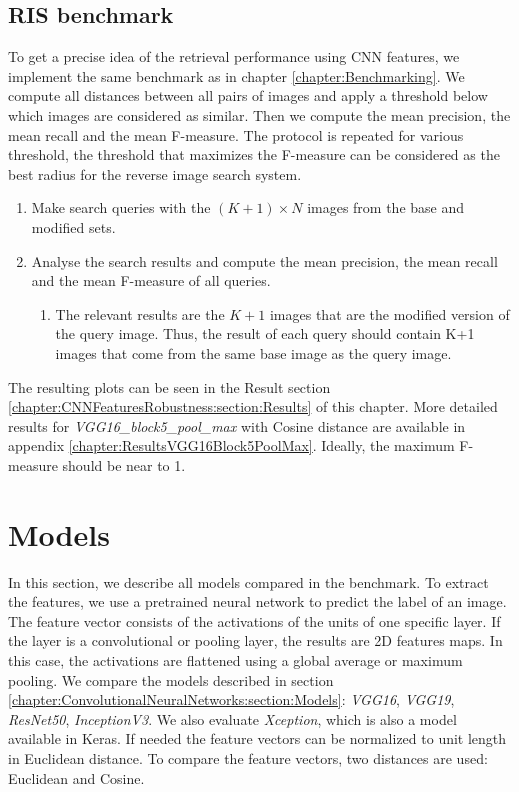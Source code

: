 \subsection{RIS benchmark}
To get a precise idea of the retrieval performance using CNN features, we implement the same benchmark as in chapter \ref{chapter:Benchmarking}. We compute all distances between all pairs of images and apply a threshold below which images are considered as similar. Then we compute the mean precision, the mean recall and the mean F-measure. The protocol is repeated for various threshold, the threshold that maximizes the F-measure can be considered as the best radius for the reverse image search system.

\begin{enumerate}
	\item Make search queries with the $(K+1) \times N$ images from the base and modified sets.
	\item Analyse the search results and compute the mean precision, the mean recall and the mean F-measure of all queries.
	\begin{enumerate}
		\item The relevant results are the $K+1$ images that are the modified version of the query image. Thus, the result of each query should contain K+1 images that come from the same base image as the query image.
	\end{enumerate}
\end{enumerate}

The resulting plots can be seen in the Result section \ref{chapter:CNNFeaturesRobustness:section:Results} of this chapter. More detailed results for \textit{VGG16\_block5\_pool\_max} with Cosine distance are available in appendix \ref{chapter:ResultsVGG16Block5PoolMax}. Ideally, the maximum F-measure should be near to 1.

\section{Models}
\label{chapter:CNNFeaturesRobustness:section:Models}
In this section, we describe all models compared in the benchmark. To extract the features, we use a pretrained neural network to predict the label of an image. The feature vector consists of the activations of the units of one specific layer. If the layer is a convolutional or pooling layer, the results are 2D features maps. In this case, the activations are flattened using a global average or maximum pooling. We compare the models described in section \ref{chapter:ConvolutionalNeuralNetworks:section:Models}: \textit{VGG16}, \textit{VGG19}, \textit{ResNet50}, \textit{InceptionV3}. We also evaluate \textit{Xception}, which is also a model available in Keras. If needed the feature vectors can be normalized to unit length in Euclidean distance. To compare the feature vectors, two distances are used: Euclidean and Cosine. 


